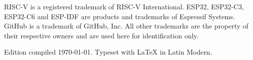 {
\vspace{1em}

\noindent
RISC\nobreakdash-V is a registered trademark of RISC\nobreakdash-V
International. ESP32, ESP32\nobreakdash-C3, ESP32\nobreakdash-C6 and
ESP\nobreakdash-IDF are products and trademarks of Espressif Systems. GitHub is
a trademark of GitHub, Inc. All other trademarks are the property of their
respective owners and are used here for identification only.\par
\vspace{1em}

\noindent
Edition compiled \today. Typeset with \LaTeX{} in Latin Modern.\par
}
\vspace*{\fill}
\clearpage
